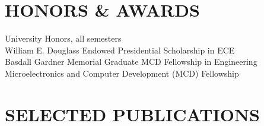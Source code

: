 \documentclass[line,margin=1in]{res}
\begin{document}
\begin{resume}
\section{HONORS \& AWARDS}
University Honors, all semesters \\
William E. Douglass Endowed Presidential Scholarship in ECE \\
Basdall Gardner Memorial Graduate MCD Fellowship in Engineering \\
Microelectronics and Computer Development (MCD) Fellowship

\section{SELECTED PUBLICATIONS}
\nocite{*}
\renewcommand{\refname}{}


\end{resume}
\end{document}
